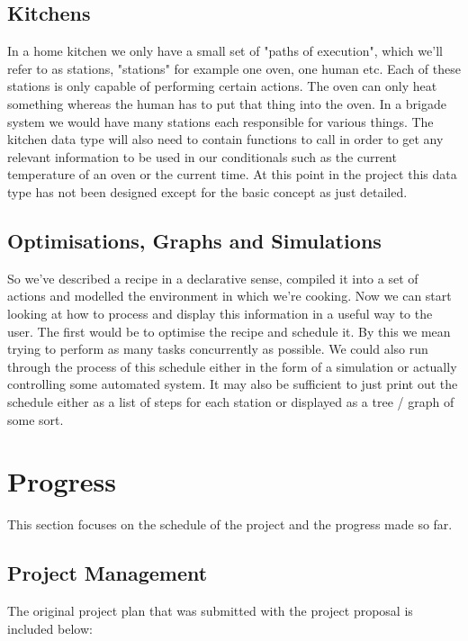\documentclass[11pt]{article}
\begin{document}
    \subsection{Kitchens}

    In a home kitchen we only have a small set of "paths of execution", which we'll refer to as stations,
    "stations" for example one oven, one human etc. Each of these stations is only capable of performing
    certain actions. The oven can only heat something whereas the human has to put that thing into the oven.
    In a brigade system we would have many stations each responsible for various things. The kitchen data
    type will also need to contain functions to call in order to get any relevant information to be used
    in our conditionals such as the current temperature of an oven or the current time. At this point in
    the project this data type has not been designed except for the basic concept as just detailed.

    \subsection{Optimisations, Graphs and Simulations}

    So we've described a recipe in a declarative sense, compiled it into a set of actions and modelled
    the environment in which we're cooking. Now we can start looking at how to process and display this
    information in a useful way to the user. The first would be to optimise the recipe and schedule it.
    By this we mean trying to perform as many tasks concurrently as possible. We could also run through
    the process of this schedule either in the form of a simulation or actually controlling some automated
    system. It may also be sufficient to just print out the schedule either as a list of steps for each
    station or displayed as a tree / graph of some sort.

    \section{Progress}

    This section focuses on the schedule of the project and the progress made so far.
    
    \subsection{Project Management}

    The original project plan that was submitted with the project proposal is included below:
\end{document}
